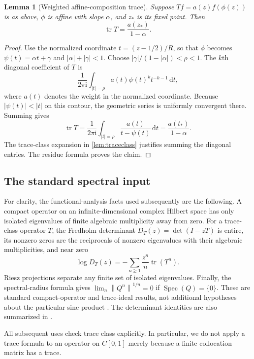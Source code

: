 \documentclass[11pt,a4paper]{article}
\newtheorem{lemma}[theorem]{Lemma}
\theoremstyle{definition}
\theoremstyle{remark}
\newcommand{\dd}{\,\mathrm d}
\newcommand{\ii}{\mathrm i}
\newcommand{\Spec}{\operatorname{Spec}}
\newcommand{\tr}{\operatorname{tr}}
\newcommand{\norm}[1]{\left\|#1\right\|}
\numberwithin{equation}{section}
\begin{document}
\begin{lemma}[Weighted affine-composition trace]
\label{lem:affine-trace}
Suppose $Tf=a(z)f(\phi(z))$ is as above, $\phi$ is affine with slope
$\alpha$, and $z_*$ is its fixed point. Then
\begin{equation}
 \tr T=\frac{a(z_*)}{1-\alpha}.
 \label{eq:affine-trace}
\end{equation}
\end{lemma}
\begin{proof}
Use the normalized coordinate $t=(z-1/2)/R$, so that
$\phi$ becomes $\psi(t)=\alpha t+\gamma$ and
$|\alpha|+|\gamma|<1$. Choose
$|\gamma|/(1-|\alpha|)<\rho<1$. The $k$th diagonal coefficient of $T$ is
\[
 \frac{1}{2\pi\ii}\int_{|t|=\rho}
      a(t)\psi(t)^k t^{-k-1}\dd t,
\]
where $a(t)$ denotes the weight in the normalized coordinate.
Because $|\psi(t)|<|t|$ on this contour, the geometric series is uniformly
convergent there. Summing gives
\[
 \tr T=\frac{1}{2\pi\ii}\int_{|t|=\rho}
       \frac{a(t)}{t-\psi(t)}\dd t
       =\frac{a(t_*)}{1-\alpha}.
\]
The trace-class expansion in \cref{lem:traceclass} justifies summing the
diagonal entries. The residue formula proves the claim.
\end{proof}

\subsection{The standard spectral input}
For clarity, the functional-analysis facts used subsequently are the
following. A compact operator on an infinite-dimensional complex Hilbert
space has only isolated eigenvalues of finite algebraic multiplicity away
from zero. For a trace-class operator $T$, the Fredholm determinant
$D_T(z)=\det(I-zT)$ is entire, its nonzero zeros are the reciprocals of
nonzero eigenvalues with their algebraic multiplicities, and near zero
\begin{equation}
 \log D_T(z)=-\sum_{n\ge1}\frac{z^n}{n}\tr(T^n).
 \label{eq:Fredholm-input}
\end{equation}
Riesz projections separate any finite set of isolated eigenvalues. Finally,
the spectral-radius formula gives
$\lim_n\norm{Q^n}^{1/n}=0$ if $\Spec(Q)=\{0\}$.
These are standard compact-operator and trace-ideal results, not additional
hypotheses about the particular sine product \cite[Ch.~3]{simon}.
The determinant identities are also summarized in
\cite[\S\S2--3, especially (3.1)--(3.4)]{bornemann}.

All subsequent uses check trace class explicitly. In particular, we do not
apply a trace formula to an operator on $C[0,1]$ merely because a finite
collocation matrix has a trace.
\end{document}
